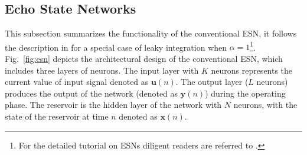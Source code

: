 \subsection{Echo State Networks}
\label{sect:esn}
% 




This subsection summarizes the functionality of the conventional ESN, it follows the description in \cite{ESNtut12} for a special case of leaky integration when $\alpha=1$\footnote{For the detailed tutorial on ESNs diligent readers are referred to \cite{ESNtut12}.}.
Fig.~\ref{fig:esn} depicts the architectural design of the conventional ESN, which includes three layers of neurons. The input layer with $K$ neurons represents the current value of input signal denoted as $\textbf{u}(n)$. The output layer ($L$ neurons) produces the output of the network (denoted as $\textbf{y}(n)$) during the operating phase. The reservoir is the hidden layer of the network with $N$ neurons, with the state of the reservoir at time $n$ denoted as $\textbf{x}(n)$. 

